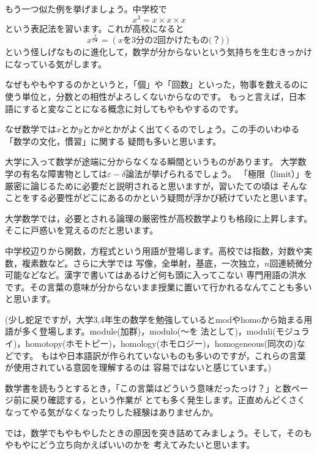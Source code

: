 \documentclass[./main]{subfiles}
\begin{document}
もう一つ似た例を挙げましょう。中学校で
\[
x^3 = x \times x \times x 
\]
という表記法を習います。これが高校になると
\[
x^{\frac{2}{3•}} = (x\text{を3分の2回かけたもの(？)})
\]
という怪しげなものに進化して，数学が分からないという気持ちを生むきっかけになっている気がします。

なぜもやもやするのかというと，「個」や「回数」といった，物事を数えるのに使う単位と，分数との相性がよろしくないからなのです。
もっと言えば，日本語にすると変なことになる概念に対してもやもやするのです。


なぜ数学では$x$とか$y$とか$\theta$とかがよく出てくるのでしょう。この手のいわゆる「数学の文化，慣習」に関する
疑問も多いと思います。


大学に入って数学が途端に分からなくなる瞬間というものがあります。
大学数学の有名な障害物としては$\varepsilon - \delta$論法が挙げられるでしょう。
「極限（limit）」を厳密に論じるために必要だと説明されると思いますが，習いたての頃は
そんなことをする必要性がどこにあるのかという疑問が浮かび続けていたと思います。

大学数学では，必要とされる論理の厳密性が高校数学よりも格段に上昇します。そこに戸惑いを覚えるのだと思います。


中学校辺りから関数，方程式という用語が登場します。高校では指数，対数や実数，複素数など。さらに大学では
写像，全単射，基底，一次独立，$n$回連続微分可能などなど。漢字で書いてはあるけど何も頭に入ってこない
専門用語の洪水です。その言葉の意味が分からないまま授業に置いて行かれるなんてことも多いと思います。

(少し蛇足ですが，大学3,4年生の数学を勉強しているとmodやhomoから始まる用語が多く登場します。module(加群)，modulo(～を
法として)，moduli(モジュライ)，homotopy(ホモトピー)，homology(ホモロジー)，homogeneous(同次の)などです。
もはや日本語訳が作られていないものも多いのですが，これらの言葉が使用されている意図を理解するのは
容易ではないと感じています。)



数学書を読もうとするとき，「この言葉はどういう意味だったっけ？」と数ページ前に戻り確認する，という作業が
とても多く発生します。正直めんどくさくなってやる気がなくなったりした経験はありませんか。


では，数学でもやもやしたときの原因を突き詰めてみましょう。そして，そのもやもやにどう立ち向かえばいいのかを
考えてみたいと思います。
\end{document}

